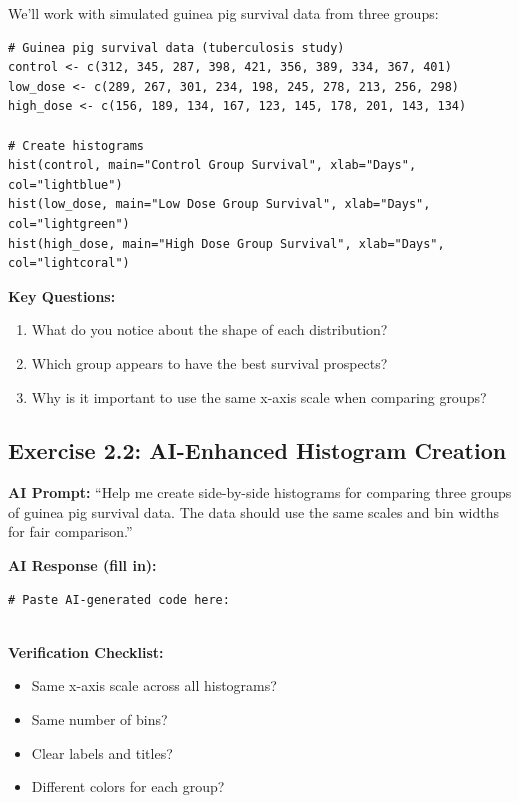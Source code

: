 \documentclass[11pt]{article}
\begin{document}
We'll work with simulated guinea pig survival data from three groups:

\begin{lstlisting}
# Guinea pig survival data (tuberculosis study)
control <- c(312, 345, 287, 398, 421, 356, 389, 334, 367, 401)
low_dose <- c(289, 267, 301, 234, 198, 245, 278, 213, 256, 298)
high_dose <- c(156, 189, 134, 167, 123, 145, 178, 201, 143, 134)

# Create histograms
hist(control, main="Control Group Survival", xlab="Days", col="lightblue")
hist(low_dose, main="Low Dose Group Survival", xlab="Days", col="lightgreen")
hist(high_dose, main="High Dose Group Survival", xlab="Days", col="lightcoral")
\end{lstlisting}

\textbf{Key Questions:}
\begin{enumerate}
\item What do you notice about the shape of each distribution?
\item Which group appears to have the best survival prospects?
\item Why is it important to use the same x-axis scale when comparing groups?
\end{enumerate}

\subsection{Exercise 2.2: AI-Enhanced Histogram Creation}

\begin{tcolorbox}[colback=aiblue!10,colframe=aiblue,boxrule=1pt,arc=2pt,left=6pt,right=6pt,top=6pt,bottom=6pt]
\textbf{\textcolor{aiblue}{AI Prompt:}} ``Help me create side-by-side histograms for comparing three groups of guinea pig survival data. The data should use the same scales and bin widths for fair comparison.''
\end{tcolorbox}

\textbf{AI Response (fill in):}
\begin{lstlisting}
# Paste AI-generated code here:


\end{lstlisting}

\textbf{Verification Checklist:}
\begin{itemize}
\item[$\square$] Same x-axis scale across all histograms?
\item[$\square$] Same number of bins?
\item[$\square$] Clear labels and titles?
\item[$\square$] Different colors for each group?
\end{itemize}
\end{document}

